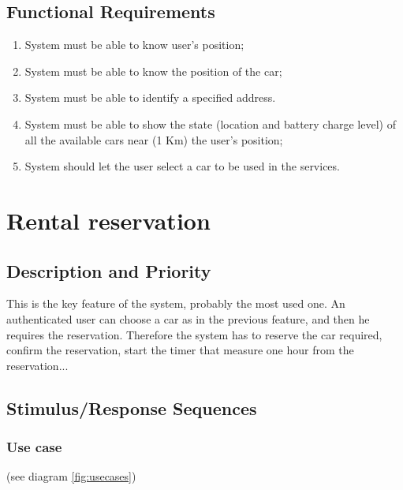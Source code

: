 \documentclass{scrreprt}
\begin{document}
\subsection{Functional Requirements}
\begin{enumerate}[label=R\arabic*.,resume]
\item System must be able to know user's position;%
\item System must be able to know the position of the car;%
\item System must be able to identify a specified address.%
\item System must be able to show the state (location and battery charge level) of all the available cars near (1 Km) the user's position;
\item System should let the user select a car to be used in the services.
\end{enumerate}

\section{Rental reservation}
\subsection{Description and Priority}
This is the key feature of the system, probably the most used one. An authenticated user can choose a car as in the previous feature, and then he requires the reservation. Therefore the system has to reserve the car required, confirm the reservation, start the timer that measure one hour from the reservation...
\subsection{Stimulus/Response Sequences}
\subsubsection{Use case}

 (see diagram \vref{fig:usecases})
\end{document}
